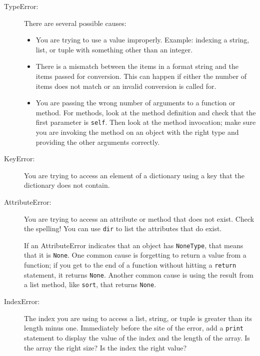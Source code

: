 \documentclass[10pt]{book}
\begin{document}
\begin{CJK}{UTF8}{gbsn}
\begin{description}
\item[TypeError:] There are several possible causes:

\begin{itemize}

\item  You are trying to use a value improperly.  Example: indexing
a string, list, or tuple with something other than an integer.

\item There is a mismatch between the items in a format string and
the items passed for conversion.  This can happen if either the number
of items does not match or an invalid conversion is called for.

\item You are passing the wrong number of arguments to a function or method.
For methods, look at the method definition and
check that the first parameter is {\tt self}.  Then look at the
method invocation; make sure you are invoking the method on an
object with the right type and providing the other arguments
correctly.

\end{itemize}

\item[KeyError:]  You are trying to access an element of a dictionary
using a key that the dictionary does not contain.

\item[AttributeError:] You are trying to access an attribute or method
that does not exist.  Check the spelling!  You can use
{\tt dir} to list the attributes that do exist.

If an AttributeError indicates that an object has {\tt NoneType},
that means that it is {\tt None}.  One common cause is forgetting
to return a value from a function; if you get to the end of
a function without hitting a {\tt return} statement, it returns
{\tt None}.  Another common cause is using the result from
a list method, like {\tt sort}, that returns {\tt None}.

\item[IndexError:] The index you are using
to access a list, string, or tuple is greater than
its length minus one.  Immediately before the site of the error,
add a {\tt print} statement to display
the value of the index and the length of the array.
Is the array the right size?  Is the index the right value?


\end{description}
\end{CJK}
\end{document}
